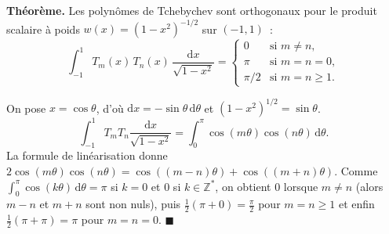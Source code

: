 \decsep{}


\begin{tcolorbox}[thmbox]
  \textbf{Théorème.}\enspace{}
  Les polynômes de Tchebychev sont orthogonaux pour le produit scalaire à
  poids $w(x)={(1-x^2)}^{-1/2}$ sur $(-1,1)$~:
  \[
    \int_{-1}^{1} T_m(x)\,T_n(x)\,\frac{\mathrm{d}x}{\sqrt{1-x^2}}
    =
    \begin{cases}
      0       & \text{si } m \neq n, \\
      \pi     & \text{si } m = n = 0, \\
      \pi/2   & \text{si } m = n \geq 1.
    \end{cases}
  \]
\end{tcolorbox}


\begin{mdframed}[style=proofbar]
  On pose $x = \cos\theta$, d'où $\mathrm{d}x = -\sin\theta\,\mathrm{d}\theta$
  et ${(1-x^2)}^{1/2} = \sin\theta$.
  \[
    \int_{-1}^{1} T_m T_n \frac{\mathrm{d}x}{\sqrt{1-x^2}}
    = \int_0^{\pi} \cos(m\theta)\cos(n\theta)\,\mathrm{d}\theta.
  \]
  La formule de linéarisation donne $2\cos(m\theta)\cos(n\theta)
  = \cos((m-n)\theta)+\cos((m+n)\theta)$. Comme
  $\int_0^{\pi}\cos(k\theta)\,\mathrm{d}\theta = \pi$ si $k=0$ et $0$ si
  $k\in\mathbb{Z}^*$, on obtient $0$ lorsque $m\neq n$ (alors $m-n$ et $m+n$
  sont non nuls), puis $\tfrac12(\pi+0)=\tfrac{\pi}{2}$ pour $m=n\geq 1$ et
  enfin $\tfrac12(\pi+\pi)=\pi$ pour $m=n=0$. \hfill$\blacksquare$
\end{mdframed}

\decsep{}



